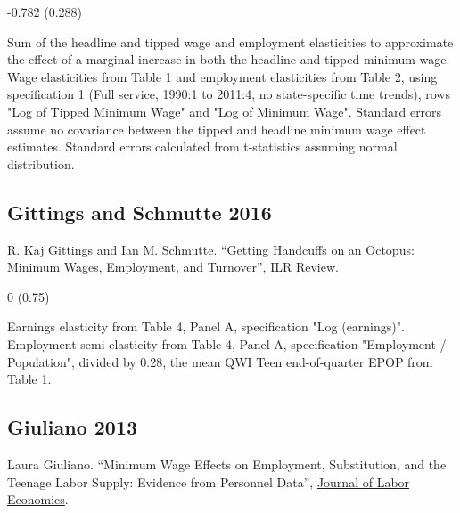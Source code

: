 \vspace{0.7em}

 -0.782 (0.288)

\vspace{0.7em}

 Sum of the headline and tipped wage and employment elasticities to approximate the effect of a marginal increase in both the headline and tipped minimum wage. Wage elasticities from Table 1 and employment elasticities from Table 2, using specification 1 (Full service, 1990:1 to 2011:4, no state-specific time trends), rows "Log of Tipped Minimum Wage" and "Log of Minimum Wage". Standard errors assume no covariance between the tipped and headline minimum wage effect estimates. Standard errors calculated from t-statistics assuming normal distribution.

\subsection*{Gittings and Schmutte 2016}
\vspace{-0.7em}

\noindent R. Kaj Gittings and Ian M. Schmutte. ``Getting Handcuffs on an Octopus: Minimum Wages, Employment, and Turnover'', \href{https://doi.org/10.1177/0019793915623519}{ILR Review}.

\vspace{0.7em}

 0 (0.75)

\vspace{0.7em}

 Earnings elasticity from Table 4, Panel A, specification "Log (earnings)". Employment semi-elasticity from Table 4, Panel A, specification "Employment / Population", divided by 0.28, the mean QWI Teen end-of-quarter EPOP from Table 1.

\subsection*{Giuliano 2013}
\vspace{-0.7em}

\noindent Laura Giuliano. ``Minimum Wage Effects on Employment, Substitution, and the Teenage Labor Supply: Evidence from Personnel Data'', \href{https://doi.org/10.1086/666921}{Journal of Labor Economics}.

\vspace{0.7em}

